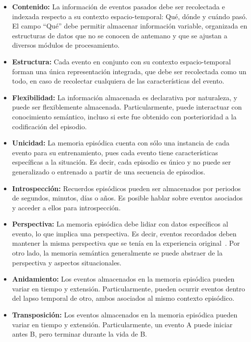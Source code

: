 \begin{itemize}[topsep=0pt]
	\setlength\itemsep{0.2em}
	\item {} {\bfseries Contenido:}
	La información de eventos pasados debe ser recolectada e indexada respecto a su contexto espacio-temporal: Qué, dónde y cuándo pasó. El campo ``Qué'' debe permitir almacenar información variable, organizada en estructuras de datos que no se conocen de antemano y que se ajustan a diversos módulos de procesamiento. 
	
	\item {} {\bfseries Estructura:}
	Cada evento en conjunto con su contexto espacio-temporal forman una única representación integrada, que debe ser recolectada como un todo, en caso de recolectar cualquiera de las características del evento.
	
	\item {} {\bfseries Flexibilidad:}
	La información almacenada es declarativa por naturaleza, y puede ser flexiblemente almacenada. Particularmente, puede interactuar con conocimiento semántico, incluso si este fue obtenido con posterioridad a la codificación del episodio.
	
	\item {} {\bfseries Unicidad:}
	La memoria episódica cuenta con sólo una instancia de cada evento para su entrenamiento, pues cada evento tiene características específicas a la situación. Es decir, cada episodio es único y no puede ser generalizado o entrenado a partir de una secuencia de episodios.
	
	\item {} {\bfseries Introspección:}
	Recuerdos episódicos pueden ser almacenados por periodos de segundos, minutos, días o años. Es posible hablar sobre eventos asociados y acceder a ellos para introspección.
	
	\item {} {\bfseries Perspectiva:}
	La memoria episódica debe lidiar con datos específicos al evento, lo que implica una perspectiva. Es decir, eventos recordados deben mantener la misma perspectiva que se tenía en la experiencia original~\cite{CLAYTON20092330}. Por otro lado, la memoria semántica generalmente se puede abstraer de la perspectiva y aspectos situacionales.
	
	\item {} {\bfseries Anidamiento:}
	Los eventos almacenados en la memoria episódica pueden variar en tiempo y extensión. Particularmente, pueden ocurrir eventos dentro del lapso temporal de otro, ambos asociados al mismo contexto episódico.
	
	\item {} {\bfseries Transposición:}
	Los eventos almacenados en la memoria episódica pueden variar en tiempo y extensión. Particularmente, un evento A puede iniciar antes B, pero terminar durante la vida de B.
	
\end{itemize}

